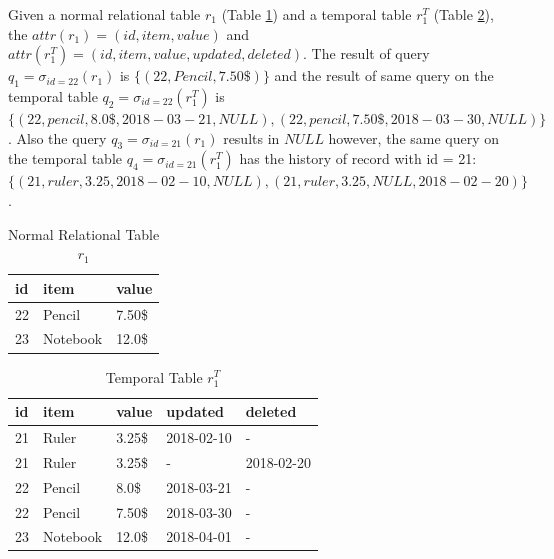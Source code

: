 		\begin{example}
			Given a normal relational table $r_1$ (Table \ref{table:normal_relational_table}) and a temporal table $r_1^T$ (Table \ref{table:temporal_table}), the $attr(r_1) = (id, item, value)$ and $attr(r_1^T)= (id, item, value, updated, deleted)$. The result of query $q_1 = \sigma_{id = 22}(r_1)$ is $\{(22,Pencil,7.50\$)\}$ and the result of same query on the temporal table $q_2 = \sigma_{id = 22}(r_1^T)$ is $\{(22,pencil,8.0\$,2018-03-21,NULL),(22,pencil,7.50\$,2018-03-30,NULL)\}$. Also the query $q_3 = \sigma_{id = 21}(r_1)$ results in $NULL$ however, the same query on the temporal table $q_4 = \sigma_{id = 21}(r_1^T)$ has the history of record with id = 21: $\{(21,ruler,3.25,2018-02-10,NULL),(21,ruler,3.25,NULL,2018-02-20)\}$.
		\label{example:temporal_table}
		\end{example}

		\begin{center}
		\begin{table}[t]
			\centering
			\caption{Normal Relational Table $r_1$}
			\label{table:normal_relational_table}
			\begin{tabular}{p{4cm}p{4cm}p{4cm}}
				\hline
				id & item      & value  \\ \hline
				22 & Pencil    & 7.50\$ \\
				23 & Notebook & 12.0\$   \\ \hline
			\end{tabular}
		\end{table}

		\begin{table}[t]
			\centering
			\caption{Temporal Table $r_1^T$}
			\label{table:temporal_table}
			\begin{tabular}{p{1cm}p{2cm}p{3cm}p{3cm}p{2cm}}
				\hline
				id & item      & value  & updated  & deleted\\ \hline
				21 & Ruler    & 3.25\$  & 2018-02-10  &  - \\  
				21 & Ruler    & 3.25\$  & -  &  2018-02-20 \\
				22 & Pencil    & 8.0\$  & 2018-03-21  &  - \\
				22 & Pencil    & 7.50\$  & 2018-03-30  &  -\\
				23 & Notebook & 12.0\$  & 2018-04-01 & - \\ \hline
			\end{tabular}
		\end{table} 
		\end{center}

